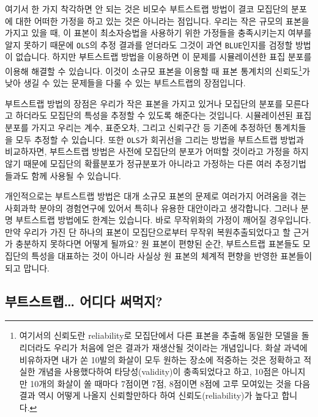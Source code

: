 \documentclass[
]{book}
\begin{document}
여기서 한 가지 착각하면 안 되는 것은 비모수 부트스트랩 방법이 결코 모집단의 분포에 대한 어떠한 가정을 하고 있는 것은 아니라는 점입니다. 우리는 작은 규모의 표본을 가지고 있을 때, 이 표본이 최소자승법을 사용하기 위한 가정들을 충족시키는지 여부를 알지 못하기 때문에 \texttt{OLS}의 추정 결과를 얻더라도 그것이 과연 \texttt{BLUE}인지를 검정할 방법이 없습니다. 하지만 부트스트랩 방법을 이용하면 이 문제를 시뮬레이션한 표집 분포를 이용해 해결할 수 있습니다. 이것이 소규모 표본을 이용할 때 표본 통계치의 신뢰도\footnote{여기서의 신뢰도란 reliability로 모집단에서 다른 표본을 추출해 동일한 모델을 돌리더라도 우리가 처음에 얻은 결과가 재생산될 것이라는 개념입니다. 화살 과녁에 비유하자면 내가 쏜 10발의 화살이 모두 원하는 장소에 적중하는 것은 정확하고 적실한 개념을 사용했다하여 타당성(validity)이 충족되었다고 하고, 10점은 아니지만 10개의 화살이 쏠 때마다 7점이면 7점, 8점이면 8점에 고루 모여있는 것을 다음 결과 역시 어떻게 나올지 신뢰할만하다 하여 신뢰도(reliability)가 높다고 합니다.}가 낮아 생길 수 있는 문제들을 다룰 수 있는 부트스트랩의 장점입니다.

부트스트랩 방법의 장점은 우리가 작은 표본을 가지고 있거나 모집단의 분포를 모른다고 하더라도 모집단의 특성을 추정할 수 있도록 해준다는 것입니다. 시뮬레이션된 표집분포를 가지고 우리는 계수, 표준오차, 그리고 신뢰구간 등 기존에 추정하던 통계치들을 모두 추정할 수 있습니다. 또한 \texttt{OLS}가 회귀선을 그리는 방법을 부트스트랩 방법과 비교하자면, 부트스트랩 방법은 사전에 모집단의 분포가 어떠할 것이라고 가정을 하지 않기 때문에 모집단의 확률분포가 정규분포가 아니라고 가정하는 다른 여러 추정기법들과도 함께 사용될 수 있습니다.

개인적으로는 부트스트랩 방법은 대개 소규모 표본의 문제로 여러가지 어려움을 겪는 사회과학 분야의 경험연구에 있어서 특히나 유용한 대안이라고 생각합니다. 그러나 분명 부트스트랩 방법에도 한계는 있습니다. 바로 무작위화의 가정이 깨어질 경우입니다. 만약 우리가 가진 단 하나의 표본이 모집단으로부터 무작위 복원추출되었다고 할 근거가 충분하지 못하다면 어떻게 될까요? 원 표본이 편향된 순간, 부트스트랩 표본들도 모집단의 특성을 대표하는 것이 아니라 사실상 원 표본의 체계적 편향을 반영한 표본들이 되고 맙니다.

\hypertarget{uxbd80uxd2b8uxc2a4uxd2b8uxb7a9-uxc5b4uxb514uxb2e4-uxc368uxba39uxc9c0}{%
\subsection{부트스트랩\ldots{} 어디다 써먹지?}\label{uxbd80uxd2b8uxc2a4uxd2b8uxb7a9-uxc5b4uxb514uxb2e4-uxc368uxba39uxc9c0}}
\end{document}
